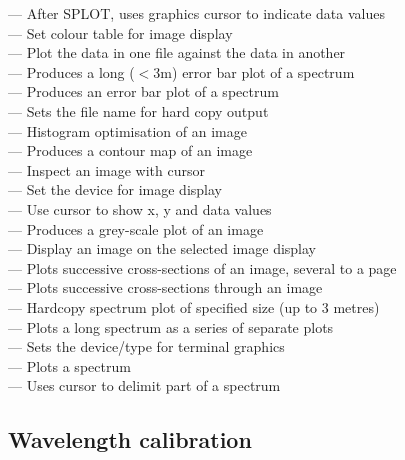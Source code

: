  --- After SPLOT, uses graphics cursor to indicate data values\\
 --- Set colour table for image display\\
 --- Plot the data in one file against the data in another\\
 --- Produces a long ($<$3m) error bar plot of a spectrum\\
 --- Produces an error bar plot of a spectrum\\
 --- Sets the file name for hard copy output\\
 --- Histogram optimisation of an image\\
 --- Produces a contour map of an image\\
 --- Inspect an image with cursor\\
 --- Set the device for image display\\
 --- Use cursor to show x, y and data values\\
 --- Produces a grey-scale plot of an image\\
 --- Display an image on the selected image display\\
 --- Plots successive cross-sections of an image, several to a page\\
 --- Plots successive cross-sections through an image\\
 --- Hardcopy spectrum plot of specified size (up to 3 metres)\\
 --- Plots a long spectrum as a series of separate plots\\
 --- Sets the device/type for terminal graphics\\
 --- Plots a spectrum\\
 --- Uses cursor to delimit part of a spectrum


\subsection{\label{classifwavelen}Wavelength calibration}


